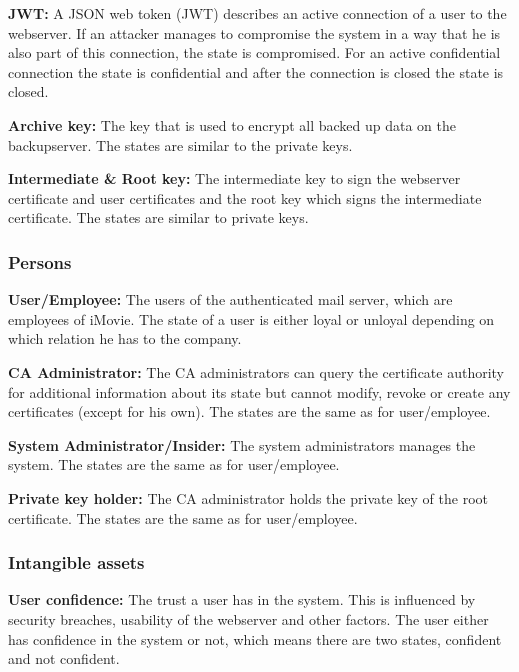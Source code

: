 \documentclass[english]{article}
\begin{document}
\begin{description}
		\item{\textbf{JWT:}} A JSON web token (JWT) describes an active connection of a user to the webserver. If an attacker manages to compromise the system in a way that he is also part of this connection, the state is compromised. For an active confidential connection the state is confidential and after the connection is closed the state is closed.
		\item{\textbf{Archive key:}} The key that is used to encrypt all backed up data on the backupserver. The states are similar to the private keys.
		\item{\textbf{Intermediate \& Root key:}} The intermediate key to sign the webserver certificate and user certificates and the root key which signs the intermediate certificate. The states are similar to private keys.
	\end{description}

\subsubsection{Persons}
\begin{description}
\item{\textbf{User/Employee:}} The users of the authenticated mail server, which are employees of iMovie. The state of a user is either loyal or unloyal depending on which relation he has to the company.
\item{\textbf{CA Administrator:}} The CA administrators can query the certificate authority for additional information about its state but cannot modify, revoke or create any certificates (except for his own). The states are the same as for user/employee.
  \item{\textbf{System Administrator/Insider:}} The system administrators manages the system. The states are the same as for user/employee.
  \item{\textbf{Private key holder:}} The CA administrator holds the private key of the root certificate. The states are the same as for user/employee.
\end{description}


\subsubsection{Intangible assets}
\begin{description}
\item{\textbf{User confidence:}} The trust a user has in the system. This is influenced by security breaches, usability of the webserver and other factors. The user either has confidence in the system or not, which means there are two states, confident and not confident.
  \end{description}
\end{document}
